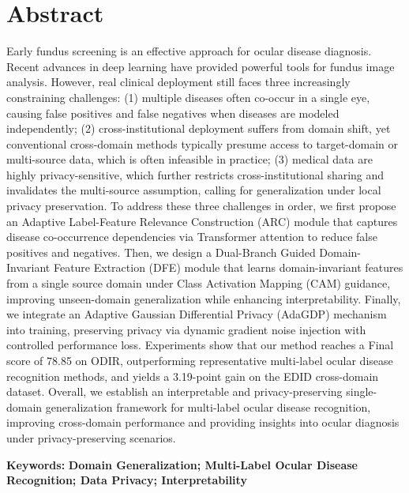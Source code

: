 
\section*{Abstract}

Early fundus screening is an effective approach for ocular disease diagnosis. Recent advances in deep learning have provided powerful tools for fundus image analysis. However, real clinical deployment still faces three increasingly constraining challenges: (1) multiple diseases often co-occur in a single eye, causing false positives and false negatives when diseases are modeled independently; (2) cross-institutional deployment suffers from domain shift, yet conventional cross-domain methods typically presume access to target-domain or multi-source data, which is often infeasible in practice; (3) medical data are highly privacy-sensitive, which further restricts cross-institutional sharing and invalidates the multi-source assumption, calling for generalization under local privacy preservation. To address these three challenges in order, we first propose an Adaptive Label-Feature Relevance Construction (ARC) module that captures disease co-occurrence dependencies via Transformer attention to reduce false positives and negatives. Then, we design a Dual-Branch Guided Domain-Invariant Feature Extraction (DFE) module that learns domain-invariant features from a single source domain under Class Activation Mapping (CAM) guidance, improving unseen-domain generalization while enhancing interpretability. Finally, we integrate an Adaptive Gaussian Differential Privacy (AdaGDP) mechanism into training, preserving privacy via dynamic gradient noise injection with controlled performance loss. Experiments show that our method reaches a Final score of 78.85 on ODIR, outperforming representative multi-label ocular disease recognition methods, and yields a 3.19-point gain on the EDID cross-domain dataset. Overall, we establish an interpretable and privacy-preserving single-domain generalization framework for multi-label ocular disease recognition, improving cross-domain performance and providing insights into ocular diagnosis under privacy-preserving scenarios.

\noindent\textbf{Keywords:}\textbf{ Domain Generalization; Multi-Label Ocular Disease Recognition; Data Privacy; Interpretability}
